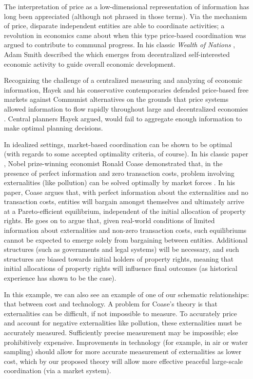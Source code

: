 \documentclass[12pt]{book}
\begin{document}
\bigskip

The interpretation of price as a low-dimensional representation of information has long been appreciated (although not phrased in those terms).
Via the mechanism of price, disparate independent entities are able to coordinate activities; a revolution in economics came about when this type price-based coordination was argued to contribute to communal progress.
In his classic \textit{Wealth of Nations} \cite{smith}, Adam Smith described the  which emerges from decentralized self-interested economic activity to guide overall economic development.

Recognizing the challenge of a centralized measuring and analyzing of economic information, Hayek and his conservative contemporaries defended price-based free markets against Communist alternatives on the grounds that price systems allowed information to flow rapidly throughout large and decentralized economies \cite{hayek}.
Central planners Hayek argued, would fail to aggregate enough information to make optimal planning decisions.

\bigskip

In idealized settings, market-based coordination can be shown to be optimal (with regards to some accepted optimality criteria, of course).
In his classic paper , Nobel prize-winning economist Ronald Coase demonstrated that, in the presence of perfect information and zero transaction costs, problem involving externalities (like pollution) can be solved optimally by market forces \cite{coase}.
In his paper, Coase argues that, with perfect information about the externalities and no transaction costs, entities will bargain amongst themselves and ultimately arrive at a Pareto-efficient equilibrium, independent of the initial allocation of property rights.
He goes on to argue that, given real-world conditions of limited information about externalities and non-zero transaction costs, such equilibriums cannot be expected to emerge solely from bargaining between entities.
Additional structures (such as governments and legal systems) will be necessary, and such structures are biased towards initial holders of property rights, meaning that initial allocations of property rights will influence final outcomes (as historical experience has shown to be the case).
 
In this example, we can also see an example of one of our schematic relationships: that between cost and technology.
A problem for Coase's theory is that externalities can be difficult, if not impossible to measure.
To accurately price and account for negative externalities like pollution, these externalities must be accurately measured.
Sufficiently precise measurement may be impossible; else prohibitively expensive.
Improvements in technology (for example, in air or water sampling) should allow for more accurate measurement of externalities as lower cost, which by our proposed theory will allow more effective peaceful large-scale coordination (via a market system).
\end{document}
